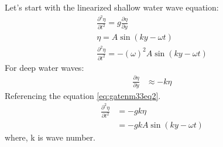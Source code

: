 \documentclass[journal,12pt,onecolumn]{IEEEtran}
\theoremstyle{remark}
\begin{document}
Let's start with the linearized shallow water wave equation:\\
\begin{align}
\frac{\partial^2 \eta}{\partial t^2}=g \frac{\partial \eta}{\partial y}\label{eq:gatenm33eq2}\\
\eta = A\sin(ky - \omega t) \label{eq:gatenm33eq3} \\
\frac{\partial^2 \eta}{\partial t^2} = -(\omega)^2 A\sin(ky - \omega t) \label{eq:gatenm33eq4}
\end{align}
For deep water waves:\\ 
\begin{align}
\frac{\partial \eta}{\partial y} &\approx -k\eta \label{eq:gatenm33eq5}
\end{align}
Referencing the equation \eqref{eq:gatenm33eq2}.
\begin{align}
\frac{\partial^2 \eta}{\partial t^2}&=-gk\eta \label{eq:gatenm33eq6}\\
&=-gk A\sin(ky - \omega t) \label{eq:gatenm33eq7}
\end{align}
where, k is wave number. \\
\end{document}
